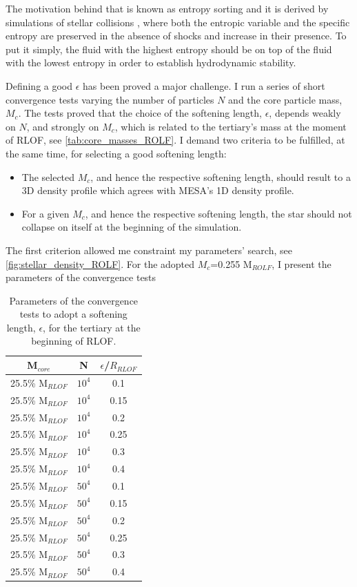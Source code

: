 The motivation behind that is known as entropy sorting and it is derived by simulations of stellar collisions \citep{lombardi1995collisions,lombardi2003modelling,lombardi2006stellar,gaburov2008mixing,gaburov2010onset}, where both the entropic variable and the specific entropy are preserved in the absence of shocks and increase in their presence. To put it simply, the fluid with the highest entropy should be on top of the fluid with the lowest entropy in order to establish hydrodynamic stability. 

Defining a good $\epsilon$ has been proved a major challenge. I run a series of short convergence tests varying the number of particles $N$ and the core particle mass, $M_c$. The tests proved that the choice of the softening length, $\epsilon$, depends weakly on $N$, and strongly on $M_c$, which is related to the tertiary's mass at the moment of RLOF, see \cref{tab:core_masses_ROLF}. I demand two criteria to be fulfilled, at the same time, for selecting a good softening length:
\begin{itemize}
    \item The selected $M_c$, and hence the respective softening length, should result to a 3D density profile which agrees with MESA's 1D density profile.
    \item For a given $M_c$, and hence the respective softening length, the star should not collapse on itself at the beginning of the simulation.
\end{itemize}
The first criterion allowed me constraint my parameters' search, see \cref{fig:stellar_density_ROLF}. For the adopted $M_c$=0.255 M$_{ROLF}$, I present the parameters of the convergence tests
\begin{table}[H]
    \centering
    \begin{tabular}{| c | c | c |}
       M$_{core}$  & N & $\epsilon$/$R_{RLOF}$ \\
       \hline
       25.5\% M$_{RLOF}$ & $10^4$ & 0.1\\
       25.5\% M$_{RLOF}$ & $10^4$ & 0.15\\
       25.5\% M$_{RLOF}$ & $10^4$ & 0.2\\
       25.5\% M$_{RLOF}$ & $10^4$ & 0.25\\
       25.5\% M$_{RLOF}$ & $10^4$ & 0.3\\
       25.5\% M$_{RLOF}$ & $10^4$ & 0.4\\
       \hline
       25.5\% M$_{RLOF}$ & $50^4$ & 0.1\\
       25.5\% M$_{RLOF}$ & $50^4$ & 0.15\\
       25.5\% M$_{RLOF}$ & $50^4$ & 0.2\\
       25.5\% M$_{RLOF}$ & $50^4$ & 0.25\\
       25.5\% M$_{RLOF}$ & $50^4$ & 0.3\\
       25.5\% M$_{RLOF}$ & $50^4$ & 0.4\\
    \end{tabular}
    \caption{ Parameters of the convergence tests to adopt a softening length, $\epsilon$, for the tertiary at the beginning of RLOF.}
\label{tab:smoothing_length_exploration}
\end{table}
